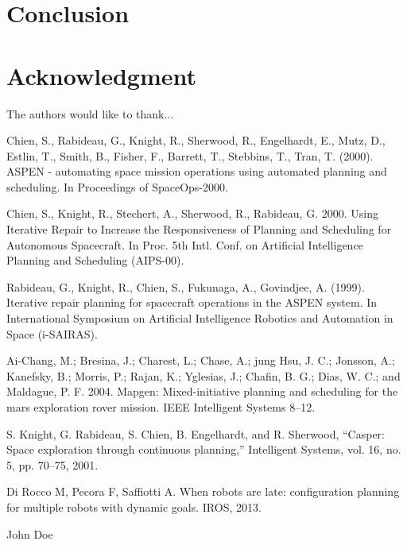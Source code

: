 \documentclass[conference]{IEEEtran}
\begin{document}
\section{Conclusion}



\section*{Acknowledgment}
The authors would like to thank...


\begin{thebibliography}{1}

Chien, S., Rabideau, G., Knight, R., Sherwood, R., Engelhardt, E., Mutz, D., Estlin, T., Smith, B., Fisher, F., Barrett, T., Stebbins, T., Tran, T. (2000). ASPEN - automating space mission operations using automated planning and scheduling. In Proceedings of SpaceOps-2000.

Chien, S., Knight, R., Stechert, A., Sherwood, R., Rabideau, G. 2000. Using Iterative Repair to Increase the Responsiveness of Planning and Scheduling for Autonomous Spacecraft. In Proc. 5th Intl. Conf. on Artificial Intelligence Planning and Scheduling (AIPS-00).

Rabideau, G., Knight, R., Chien, S., Fukunaga, A., Govindjee, A. (1999). Iterative repair planning for spacecraft operations in the ASPEN system. In International Symposium on Artificial Intelligence Robotics and Automation in Space (i-SAIRAS).

Ai-Chang, M.; Bresina, J.; Charest, L.; Chase, A.; jung Hsu, J. C.; Jonsson, A.; Kanefsky, B.; Morris, P.; Rajan, K.; Yglesias, J.; Chafin, B. G.; Dias, W. C.; and Maldague, P. F. 2004. Mapgen: Mixed-initiative planning and scheduling for the mars exploration rover mission. IEEE Intelligent Systems 8–12.

S. Knight, G. Rabideau, S. Chien, B. Engelhardt, and R. Sherwood,
“Casper: Space exploration through continuous planning,” Intelligent
Systems, vol. 16, no. 5, pp. 70–75, 2001.

Di Rocco M, Pecora F, Saffiotti A. When robots are late: configuration planning for multiple robots with dynamic goals. IROS, 2013.


\end{thebibliography}


\begin{IEEEbiography}{John Doe}
\end{IEEEbiography}
\end{document}
